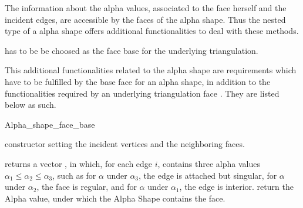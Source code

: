 The information about the alpha values, associated to the face herself and the
incident edges, are accessible by the 
faces of the alpha shape. Thus the nested 
type of a alpha shape offers additional functionalities to deal with these
methods.

 has to be be choosed as the face base for the underlying triangulation. 

This additional functionalities related to the alpha shape
are requirements which have to be fulfilled
by the base face  for an alpha shape,
in addition to the functionalities required by an underlying triangulation face .
They are listed below as such.

\ccInheritsFrom


\begin{ccClass}{Alpha_shape_face_base}

\ccTypes



\ccCreation

\begin{ccAdvanced}

\ccGlue
{}
\ccGlue
{} 
{constructor setting the incident vertices and the neighboring faces.}

\end{ccAdvanced}

{returns a vector , in which, for each edge $i$,  contains
three alpha values
 $\alpha_1 \leq \alpha_2 \leq \alpha_3$, such as for
$\alpha$ under $\alpha_3$, the edge is attached but singular,
for $\alpha$ under $\alpha_2$, the face is regular, and for $\alpha$
under $\alpha_1$, the edge is interior.}
{return the Alpha value, under which the Alpha Shape contains the
face.}


\end{ccClass}
